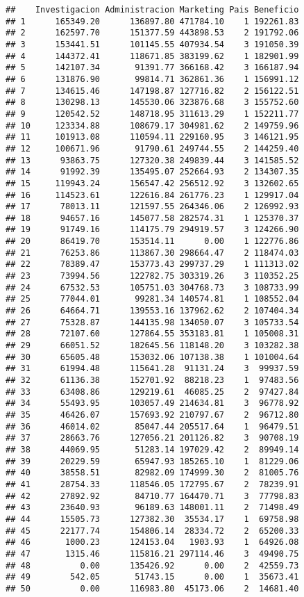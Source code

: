 \documentclass[]{article}
\begin{document}
\begin{verbatim}
##    Investigacion Administracion Marketing Pais Beneficio
## 1      165349.20      136897.80 471784.10    1 192261.83
## 2      162597.70      151377.59 443898.53    2 191792.06
## 3      153441.51      101145.55 407934.54    3 191050.39
## 4      144372.41      118671.85 383199.62    1 182901.99
## 5      142107.34       91391.77 366168.42    3 166187.94
## 6      131876.90       99814.71 362861.36    1 156991.12
## 7      134615.46      147198.87 127716.82    2 156122.51
## 8      130298.13      145530.06 323876.68    3 155752.60
## 9      120542.52      148718.95 311613.29    1 152211.77
## 10     123334.88      108679.17 304981.62    2 149759.96
## 11     101913.08      110594.11 229160.95    3 146121.95
## 12     100671.96       91790.61 249744.55    2 144259.40
## 13      93863.75      127320.38 249839.44    3 141585.52
## 14      91992.39      135495.07 252664.93    2 134307.35
## 15     119943.24      156547.42 256512.92    3 132602.65
## 16     114523.61      122616.84 261776.23    1 129917.04
## 17      78013.11      121597.55 264346.06    2 126992.93
## 18      94657.16      145077.58 282574.31    1 125370.37
## 19      91749.16      114175.79 294919.57    3 124266.90
## 20      86419.70      153514.11      0.00    1 122776.86
## 21      76253.86      113867.30 298664.47    2 118474.03
## 22      78389.47      153773.43 299737.29    1 111313.02
## 23      73994.56      122782.75 303319.26    3 110352.25
## 24      67532.53      105751.03 304768.73    3 108733.99
## 25      77044.01       99281.34 140574.81    1 108552.04
## 26      64664.71      139553.16 137962.62    2 107404.34
## 27      75328.87      144135.98 134050.07    3 105733.54
## 28      72107.60      127864.55 353183.81    1 105008.31
## 29      66051.52      182645.56 118148.20    3 103282.38
## 30      65605.48      153032.06 107138.38    1 101004.64
## 31      61994.48      115641.28  91131.24    3  99937.59
## 32      61136.38      152701.92  88218.23    1  97483.56
## 33      63408.86      129219.61  46085.25    2  97427.84
## 34      55493.95      103057.49 214634.81    3  96778.92
## 35      46426.07      157693.92 210797.67    2  96712.80
## 36      46014.02       85047.44 205517.64    1  96479.51
## 37      28663.76      127056.21 201126.82    3  90708.19
## 38      44069.95       51283.14 197029.42    2  89949.14
## 39      20229.59       65947.93 185265.10    1  81229.06
## 40      38558.51       82982.09 174999.30    2  81005.76
## 41      28754.33      118546.05 172795.67    2  78239.91
## 42      27892.92       84710.77 164470.71    3  77798.83
## 43      23640.93       96189.63 148001.11    2  71498.49
## 44      15505.73      127382.30  35534.17    1  69758.98
## 45      22177.74      154806.14  28334.72    2  65200.33
## 46       1000.23      124153.04   1903.93    1  64926.08
## 47       1315.46      115816.21 297114.46    3  49490.75
## 48          0.00      135426.92      0.00    2  42559.73
## 49        542.05       51743.15      0.00    1  35673.41
## 50          0.00      116983.80  45173.06    2  14681.40
\end{verbatim}
\end{document}
